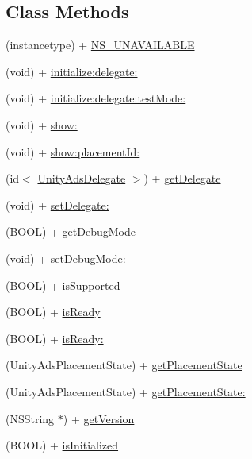 \subsection*{Class Methods}
\begin{DoxyCompactItemize}
\item 
(instancetype) + \mbox{\hyperlink{interface_unity_ads_a5e5d2f9d0967ae24896451e0fa1d7d05}{N\+S\+\_\+\+U\+N\+A\+V\+A\+I\+L\+A\+B\+LE}}
\item 
(void) + \mbox{\hyperlink{interface_unity_ads_a89dc56c878efb376b6014d0ef67778a9}{initialize\+:delegate\+:}}
\item 
(void) + \mbox{\hyperlink{interface_unity_ads_a95a142d4966bb89652bfec178795e017}{initialize\+:delegate\+:test\+Mode\+:}}
\item 
(void) + \mbox{\hyperlink{interface_unity_ads_a9246ffcfb9c831021f57cf81c21d3757}{show\+:}}
\item 
(void) + \mbox{\hyperlink{interface_unity_ads_a3b26d257b4fcc8807df6878bb0db09ea}{show\+:placement\+Id\+:}}
\item 
(id$<$ \mbox{\hyperlink{protocol_unity_ads_delegate-p}{Unity\+Ads\+Delegate}} $>$) + \mbox{\hyperlink{interface_unity_ads_a4b9aac259a3cb9906685eca5cbf5af5e}{get\+Delegate}}
\item 
(void) + \mbox{\hyperlink{interface_unity_ads_af3fd5286dccef9e7f0557694cc0d747b}{set\+Delegate\+:}}
\item 
(B\+O\+OL) + \mbox{\hyperlink{interface_unity_ads_ad7d6aade30273f805bd0f077fd29e0c9}{get\+Debug\+Mode}}
\item 
(void) + \mbox{\hyperlink{interface_unity_ads_a8fb72943aa227334bf7219725ef8eb5b}{set\+Debug\+Mode\+:}}
\item 
(B\+O\+OL) + \mbox{\hyperlink{interface_unity_ads_a88647c57b1d0a967ac74d9f847982561}{is\+Supported}}
\item 
(B\+O\+OL) + \mbox{\hyperlink{interface_unity_ads_ad6957c0e6ebdd2b2e5f17e97310ccd2d}{is\+Ready}}
\item 
(B\+O\+OL) + \mbox{\hyperlink{interface_unity_ads_ab599b1f26750aa88f4e0c7be90203276}{is\+Ready\+:}}
\item 
(Unity\+Ads\+Placement\+State) + \mbox{\hyperlink{interface_unity_ads_ae6cb2c812b3ecb379d4ece62e6d22b34}{get\+Placement\+State}}
\item 
(Unity\+Ads\+Placement\+State) + \mbox{\hyperlink{interface_unity_ads_abcd2309e4f159ca5f6c8bc55e1d13e78}{get\+Placement\+State\+:}}
\item 
(N\+S\+String $\ast$) + \mbox{\hyperlink{interface_unity_ads_adfc15977cddb12f40d465060e23f79f4}{get\+Version}}
\item 
(B\+O\+OL) + \mbox{\hyperlink{interface_unity_ads_a8698d281f4758d79a70bd20f6db4a622}{is\+Initialized}}
\end{DoxyCompactItemize}


